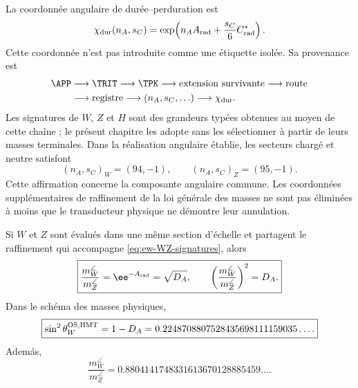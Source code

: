 La coordonnée angulaire de durée--perduration est
\begin{equation}
\label{eq:ew-angular-character}
\chi_{\rm dur}(n_A,s_C)
=\exp\!\left(n_AA_{\rm rad}
+\frac{s_C}{6}C^*_{\rm rad}\right).
\end{equation}
Cette coordonnée n'est pas introduite comme une étiquette isolée. Sa provenance est
\begin{equation}
\label{eq:ew-signature-provenance}
\begin{aligned}
\APP&\longrightarrow\TRIT\longrightarrow\TPK
\longrightarrow\text{extension survivante}
\longrightarrow\text{route}\\
&\longrightarrow\text{registre}
\longrightarrow(n_A,s_C,\ldots)
\longrightarrow\chi_{\rm dur}.
\end{aligned}
\end{equation}
Les signatures de \(W\), \(Z\) et \(H\) sont des grandeurs typées obtenues au moyen de
cette chaîne ; le présent chapitre les adopte sans les sélectionner à partir de
leurs masses terminales. Dans la réalisation angulaire établie, les secteurs
chargé et neutre satisfont
\begin{equation}
\label{eq:ew-WZ-signatures}
(n_A,s_C)_W=(94,-1),
\qquad
(n_A,s_C)_Z=(95,-1).
\end{equation}
Cette affirmation concerne la composante angulaire commune. Les
coordonnées supplémentaires de raffinement de la loi générale des masses ne sont pas
éliminées à moins que le transducteur physique ne démontre leur annulation.

\begin{theorem}
\label{thm:ew-weinberg}
Si \(W\) et \(Z\) sont évalués dans une même section d'échelle et partagent
le raffinement qui accompagne \cref{eq:ew-WZ-signatures}, alors
\begin{equation}
\label{eq:ew-WZ-ratio}
\boxed{
\frac{m_W^{\angle}}{m_Z^{\angle}}
=\ee^{-A_{\rm rad}}=\sqrt{D_A},
\qquad
\left(\frac{m_W^{\angle}}{m_Z^{\angle}}\right)^2=D_A.}
\end{equation}
Dans le schéma des masses physiques,
\begin{equation}
\label{eq:ew-sin2thetaW}
\boxed{
\sin^2\theta_W^{\rm OS,HMT}=1-D_A
=0.2248708807528435698111159035\ldots .}
\end{equation}
Adem\'as,
\begin{equation}
\label{eq:ew-WZ-terminal-ratio}
\frac{m_W^{\angle}}{m_Z^{\angle}}
=0.8804141748331613670128885459\ldots .
\end{equation}
\end{theorem}

